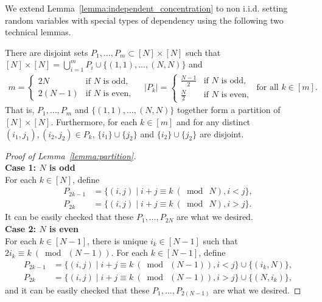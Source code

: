 We extend Lemma~\ref{lemma:independent_concentration} to non i.i.d. setting random variables with special types of dependency using the following two technical lemmas.
\begin{lemma}\label{lemma:partition}
There are disjoint sets $P_1, \dots, P_m \subset [N] \times [N]$ such that $[N] \times [N]  = \bigcup_{i=1}^m P_i \cup \{(1,1), \dots, (N,N) \}$ and 
\begin{align*}
    m = 
    \begin{cases}
    2N &\text{if $N$ is odd},\\
    2(N-1) & \text{if $N$ is even},
    \end{cases}
    \quad
    |P_k| = 
    \begin{cases}
    \frac{N-1}{2} & \text{if $N$ is odd},\\
    \frac{N}{2} & \text{if $N$ is even},
    \end{cases}
    \text{ for all } k \in [m].
\end{align*}
That is, $P_1, \dots, P_m$ and $\{(1,1), \dots, (N,N)\}$ together form a partition of $[N] \times [N]$.
Furthermore, for each $k \in [m]$ and for any distinct $(i_1, j_1), (i_2, j_2) \in P_k$, 
$\{i_1\} \cup \{j_2 \}$ and $\{i_2\} \cup \{j_2\}$ are disjoint.
\end{lemma}
\begin{proof}[Proof of Lemma~\ref{lemma:partition}]\mbox{}\\
\textbf{Case 1: $N$ is odd}\\
For each $k \in [N]$, define
\begin{align*}
    P_{2k-1} &= \{(i,j) \mid i+j \equiv k ~(\bmod ~N), i<j\},\\ 
    P_{2k} &= \{(i,j) \mid i+j \equiv k ~(\bmod ~N), i>j \}.
\end{align*}
It can be easily checked that these $P_1, \dots, P_{2N}$ are what we desired.\\
\textbf{Case 2: $N$ is even}\\
For each $k\in [N-1]$, there is unique $i_k\in [N-1]$ such that $2i_k \equiv k ~(\bmod ~(N-1))$. For each $k \in [N-1]$, define
\begin{align*}
    P_{2k-1} &= \{(i,j) \mid i+j \equiv k ~(\bmod ~(N-1)), i<j\} \cup \{(i_k,N)\},\\
    P_{2k} &= \{(i,j) \mid i+j \equiv k ~(\bmod ~(N-1)), i>j \}\cup \{(N,i_k)\},
\end{align*}
and it can be easily checked that these $P_1, \dots, P_{2(N-1)}$ are what we desired. 
\end{proof}
